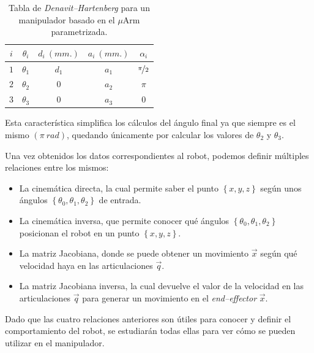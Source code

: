 \begin{table}[H]
    \centering
    \begin{tabular}{ c | c c c c }
        $i$ & $\theta_i$ & $d_i~(mm.)$ & $a_i~(mm.)$ & $\alpha_i$          \\ [0.5ex]
        \hline
        $1$ & $\theta_1$ & $d_1$       & $a_1$       & $\nicefrac{\pi}{2}$ \\
        $2$ & $\theta_2$ & $0$         & $a_2$       & $\pi$               \\
        $3$ & $\theta_3$ & $0$         & $a_3$       & $0$                 \\ [1ex]
    \end{tabular}
    \caption{Tabla de \textit{Denavit–Hartenberg} para un manipulador basado en el $\mu$Arm parametrizada.}
    \label{tab:dh-params}
\end{table}

Esta característica simplifica los cálculos del ángulo final ya que siempre es el mismo
$\left(\pi~rad\right)$, quedando únicamente por calcular los valores de $\theta_2$ y 
$\theta_3$.

Una vez obtenidos los datos correspondientes al robot, podemos definir múltiples 
relaciones entre los mismos:
\begin{itemize}
    \item La cinemática directa, la cual permite saber el punto $\left\{x, y, z\right\}$
          según unos ángulos $\left\{\theta_0, \theta_1, \theta_2\right\}$ de entrada.
    \item La cinemática inversa, que permite conocer qué ángulos 
          $\left\{\theta_0, \theta_1, \theta_2\right\}$ posicionan el robot en un punto
          $\left\{x, y, z\right\}$.
    \item La matriz Jacobiana, donde se puede obtener un movimiento $\overrightarrow{x}$ según 
          qué velocidad haya en las articulaciones $\overrightarrow{q}$.
    \item La matriz Jacobiana inversa, la cual devuelve el valor de la velocidad en
          las articulaciones $\overrightarrow{q}$ para generar un movimiento en el 
          \textit{end--effector} $\overrightarrow{x}$.
\end{itemize}

Dado que las cuatro relaciones anteriores son útiles para conocer y definir
el comportamiento del robot, se estudiarán todas ellas para ver cómo se pueden utilizar
en el manipulador.